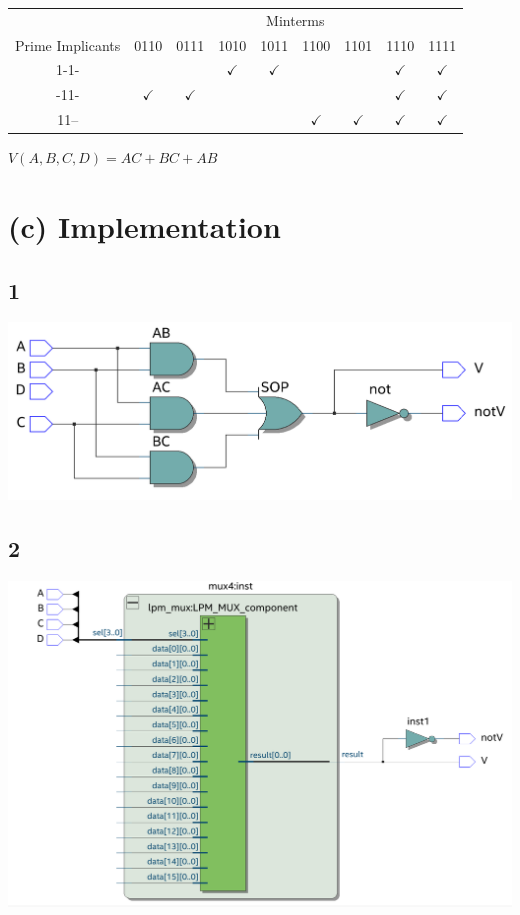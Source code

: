 \documentclass{article}
\begin{document}
\begin{tabular}{|c|c|c|c|c|c|c|c|c|}
    \hline
                     & \multicolumn{8}{|c|}{Minterms}                                                                                                                            \\
    \cline{2-9}
    Prime Implicants & 0110                           & 0111           & 1010           & 1011           & 1100           & 1101           & 1110             & 1111             \\
    \hline
    1-1-             &                                &                & \(\checkmark\) & \(\checkmark\) &                &                & \( \checkmark \) & \( \checkmark \) \\
    -11-             & \(\checkmark\)                 & \(\checkmark\) &                &                &                &                & \( \checkmark \) & \( \checkmark \) \\
    11--             &                                &                &                &                & \(\checkmark\) & \(\checkmark\) & \( \checkmark \) & \( \checkmark \) \\
    \hline
\end{tabular}

\(V(A,B,C,D) = AC + BC + AB\)

\section*{(c) Implementation}
\subsection*{1}
\includegraphics*[width=\textwidth]{impl1}
\subsection*{2}
\includegraphics*[width=\textwidth]{impl2}
\end{document}
